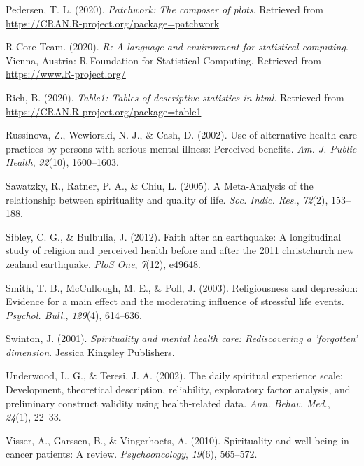 \documentclass[
  english,
  man,floatsintext]{apa6}
\begin{document}
\leavevmode\hypertarget{ref-R-patchwork}{}%
Pedersen, T. L. (2020). \emph{Patchwork: The composer of plots}. Retrieved from \url{https://CRAN.R-project.org/package=patchwork}

\leavevmode\hypertarget{ref-R-base}{}%
R Core Team. (2020). \emph{R: A language and environment for statistical computing}. Vienna, Austria: R Foundation for Statistical Computing. Retrieved from \url{https://www.R-project.org/}

\leavevmode\hypertarget{ref-R-table1}{}%
Rich, B. (2020). \emph{Table1: Tables of descriptive statistics in html}. Retrieved from \url{https://CRAN.R-project.org/package=table1}

\leavevmode\hypertarget{ref-Russinova2002-rq}{}%
Russinova, Z., Wewiorski, N. J., \& Cash, D. (2002). Use of alternative health care practices by persons with serious mental illness: Perceived benefits. \emph{Am. J. Public Health}, \emph{92}(10), 1600--1603.

\leavevmode\hypertarget{ref-Sawatzky2005-rw}{}%
Sawatzky, R., Ratner, P. A., \& Chiu, L. (2005). A Meta-Analysis of the relationship between spirituality and quality of life. \emph{Soc. Indic. Res.}, \emph{72}(2), 153--188.

\leavevmode\hypertarget{ref-sibley2012faith}{}%
Sibley, C. G., \& Bulbulia, J. (2012). Faith after an earthquake: A longitudinal study of religion and perceived health before and after the 2011 christchurch new zealand earthquake. \emph{PloS One}, \emph{7}(12), e49648.

\leavevmode\hypertarget{ref-Smith2003-re}{}%
Smith, T. B., McCullough, M. E., \& Poll, J. (2003). Religiousness and depression: Evidence for a main effect and the moderating influence of stressful life events. \emph{Psychol. Bull.}, \emph{129}(4), 614--636.

\leavevmode\hypertarget{ref-Swinton2001-vr}{}%
Swinton, J. (2001). \emph{Spirituality and mental health care: Rediscovering a 'forgotten' dimension}. Jessica Kingsley Publishers.

\leavevmode\hypertarget{ref-Underwood2002-hg}{}%
Underwood, L. G., \& Teresi, J. A. (2002). The daily spiritual experience scale: Development, theoretical description, reliability, exploratory factor analysis, and preliminary construct validity using health-related data. \emph{Ann. Behav. Med.}, \emph{24}(1), 22--33.

\leavevmode\hypertarget{ref-Visser2010-kq}{}%
Visser, A., Garssen, B., \& Vingerhoets, A. (2010). Spirituality and well-being in cancer patients: A review. \emph{Psychooncology}, \emph{19}(6), 565--572.
\end{document}
